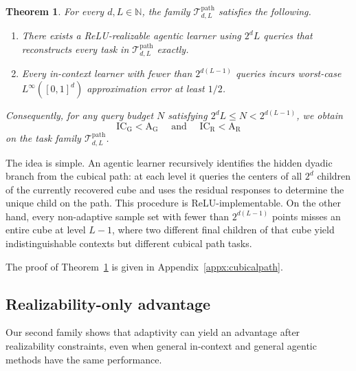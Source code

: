 \documentclass{article}
\newtheorem{theorem}{Theorem}[section]
\newcommand{\eqdef }{\ensuremath{\stackrel{\mbox{\upshape\tiny def.}}{=}}}
\newcommand{\ICG}{\mathrm{IC_G}}
\newcommand{\ICR}{\mathrm{IC_R}}
\newcommand{\AG}{\mathrm{A_G}}
\newcommand{\AR}{\mathrm{A_R}}
\begin{document}
\begin{theorem}
\label{thm:path}
For every $d,L\in\mathbb N$, the family $\mathcal{T}_{d,L}^{\mathrm{path}}$ satisfies the
following.
\begin{enumerate}
    \item[\rm (i)] There exists a ReLU-realizable agentic learner using $2^dL$ queries that
    reconstructs every task in $\mathcal{T}_{d,L}^{\mathrm{path}}$ exactly.
    \item[\rm (ii)] Every %
    in-context learner with fewer than $2^{d(L-1)}$ queries incurs
    worst-case $L^\infty([0,1]^d)$ approximation error at least $1/2$.
\end{enumerate}
Consequently, for any query budget $N$ satisfying $2^dL \leq N < 2^{d(L-1)}$, we obtain
\[
\ICG<\AG
\quad\text{ and }\quad
\ICR<\AR
\]
on the task family $\mathcal{T}_{d,L}^{\mathrm{path}}$.
\end{theorem}

The idea is simple. An agentic learner recursively identifies the hidden dyadic branch from the cubical path: at each level it
queries the centers of all $2^d$ children of the currently recovered cube and uses the residual
responses to determine the unique child on the path. This procedure %
is ReLU-implementable. 
On the other hand, every non-adaptive sample set with fewer than $2^{d(L-1)}$ points misses an entire cube
at level $L-1$, where two different final children of that cube yield indistinguishable contexts but
different cubical path tasks. 

The proof of Theorem~\ref{thm:path} is given in Appendix~\ref{appx:cubicalpath}.




\subsection{Realizability-only advantage}
\label{s:Main__ss:realizabilityonly}

Our second family shows that adaptivity can yield an advantage after realizability constraints, %
even when general in-context and general agentic methods have the same performance. 
\end{document}
